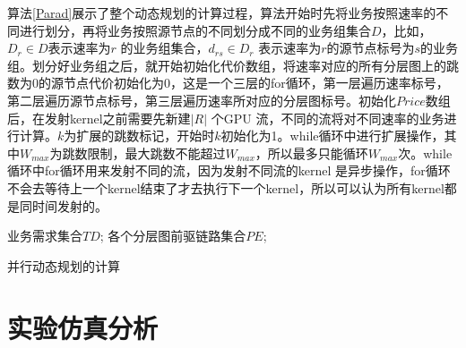 算法\ref{Parad}展示了整个动态规划的计算过程，算法开始时先将业务按照速率的不同进行划分，再将业务按照源节点的不同划分成不同的业务组集合$D$，比如，$D_r \in D$表示速率为$r$ 的业务组集合，$d_{rs} \in D_r$ 表示速率为$r$的源节点标号为$s$的业务组。划分好业务组之后，就开始初始化代价数组，将速率对应的所有分层图上的跳数为0的源节点代价初始化为0，这是一个三层的for循环，第一层遍历速率标号，第二层遍历源节点标号，第三层遍历速率所对应的分层图标号。初始化$Price$数组后，在发射kernel之前需要先新建$|R|$ 个GPU 流，不同的流将对不同速率的业务进行计算。$k$为扩展的跳数标记，开始时$k$初始化为1。while循环中进行扩展操作，其中$W_{max}$为跳数限制，最大跳数不能超过$W_{max}$，所以最多只能循环$W_{max}$次。while循环中for循环用来发射不同的流，因为发射不同流的kernel 是异步操作，for循环不会去等待上一个kernel结束了才去执行下一个kernel，所以可以认为所有kernel都是同时间发射的。
\begin{algorithm}[t]
\begin{algorithmic}[1]
\Require
业务需求集合$TD$;
各个分层图前驱链路集合$PE$;
\Else
{}
\EndIf
{}
\EndFor
\EndFor
\EndFor
\EndFor
{}
\EndFor
{}
\EndWhile
{}
\end{algorithmic}
\caption{{并行动态规划的计算}}
\label{Parad}
\end{algorithm}


\section{实验仿真分析}
